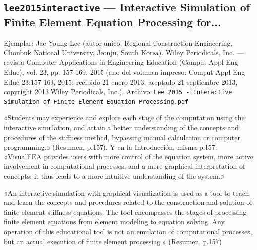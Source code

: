 \documentclass[11pt,a4paper]{article}
\newcommand{\campo}[1]{\textcolor{gris}{\footnotesize #1}}
\begin{document}
\subsection{\texttt{lee2015interactive} --- Interactive Simulation of Finite Element Equation Processing for...}
{\footnotesize\campo{Ejemplar:} Jae Young Lee (autor unico; Regional Construction Engineering, Chonbuk National University, Jeonju, South Korea). Wiley Periodicals, Inc. --- revista Computer Applications in Engineering Education (Comput Appl Eng Educ), vol. 23, pp. 157-169. 2015 (ano del volumen impreso: \textquotedbl{}Comput Appl Eng Educ 23:157-169, 2015\textquotedbl{}; recibido 21 enero 2013, aceptado 21 septiembre 2013, copyright \textquotedbl{}2013 Wiley Periodicals, Inc.\textquotedbl{}). \campo{Archivo:} \texttt{Lee 2015 - Interactive Simulation of Finite Element Equation Processing.pdf}\par}\vspace{4pt}
\vspace{3pt}\noindent{\small\textbf{p.\ 157} \quad \campo{«La literatura sobre enseñanza del método coincide en que la simulación interactiva y la manipulación directa de los objetos matemáticos del MEF favorecen un aprendizaje más profundo que la mera exposición teórica o el uso de herramientas opacas» --- tesis/capitulos/01\_introduccion.tex:21}}\par
\begin{pasaje}\footnotesize «Students may experience and explore each stage of the computation using the interactive simulation, and attain a better understanding of the concepts and procedures of the stiffness method, bypassing manual calculation or computer programming.» (Resumen, p.157). Y en la Introducción, misma p.157: «VisualFEA provides users with more control of the equation system, more active involvement in computational processes, and a more graphical interpretation of concepts; it thus leads to a more intuitive understanding of the system.»\end{pasaje}
\vspace{3pt}\noindent{\small\textbf{p.\ 157} \quad \campo{«Fundamentada en la literatura sobre enseñanza del MEF, que documenta el valor de la simulación interactiva y de la manipulación directa de los objetos matemáticos del método, esa transparencia constituye un apoyo plausible al aprendizaje de sus fundamentos» --- tesis/capitulos/01\_introduccion.tex:44}}\par
\begin{pasaje}\footnotesize «An interactive simulation with graphical visualization is used as a tool to teach and learn the concepts and procedures related to the construction and solution of finite element stiffness equations. The tool encompasses the stages of processing finite element equations from element modeling to equation solving. Any operation of this educational tool is not an emulation of computational processes, but an actual execution of finite element processing.» (Resumen, p.157)\end{pasaje}
\end{document}
